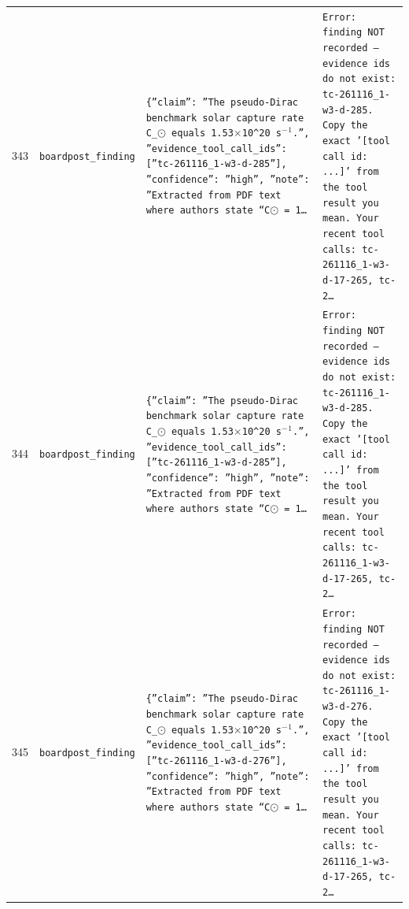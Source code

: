 \documentclass[11pt,a4paper]{article}
\begin{document}
\begin{longtable}{@{}p{}p{}p{}p{}@{}}
343 & \texttt{board}\newline\texttt{post\_\allowbreak{}finding} & \texttt{\{''claim'':\allowbreak{} ''The pseudo-Dirac benchmark solar capture rate C\_\allowbreak{}$\odot$ equals 1.53$\times$10\textasciicircum{}\allowbreak{}20~s$^-$$^1$.'',\allowbreak{} ''evidence\_\allowbreak{}tool\_\allowbreak{}call\_\allowbreak{}ids'':\allowbreak{} [''tc-261116\_\allowbreak{}1-w3-d-285'']\allowbreak{},\allowbreak{} ''confidence'':\allowbreak{} ''high'',\allowbreak{} ''note'':\allowbreak{} ''Extracted from PDF text where authors state ``C$\odot$ =\allowbreak{} 1\ldots{}\allowbreak{}} & \texttt{Error:\allowbreak{} finding NOT recorded --- evidence ids do not exist:\allowbreak{} tc-261116\_\allowbreak{}1-w3-d-285. Copy the exact '[tool call id:\allowbreak{} ...]\allowbreak{}' from the tool result you mean. Your recent tool calls:\allowbreak{} tc-261116\_\allowbreak{}1-w3-d-17-265,\allowbreak{} tc-2\ldots{}\allowbreak{}} \\
344 & \texttt{board}\newline\texttt{post\_\allowbreak{}finding} & \texttt{\{''claim'':\allowbreak{} ''The pseudo-Dirac benchmark solar capture rate C\_\allowbreak{}$\odot$ equals 1.53$\times$10\textasciicircum{}\allowbreak{}20~s$^-$$^1$.'',\allowbreak{} ''evidence\_\allowbreak{}tool\_\allowbreak{}call\_\allowbreak{}ids'':\allowbreak{} [''tc-261116\_\allowbreak{}1-w3-d-285'']\allowbreak{},\allowbreak{} ''confidence'':\allowbreak{} ''high'',\allowbreak{} ''note'':\allowbreak{} ''Extracted from PDF text where authors state ``C$\odot$ =\allowbreak{} 1\ldots{}\allowbreak{}} & \texttt{Error:\allowbreak{} finding NOT recorded --- evidence ids do not exist:\allowbreak{} tc-261116\_\allowbreak{}1-w3-d-285. Copy the exact '[tool call id:\allowbreak{} ...]\allowbreak{}' from the tool result you mean. Your recent tool calls:\allowbreak{} tc-261116\_\allowbreak{}1-w3-d-17-265,\allowbreak{} tc-2\ldots{}\allowbreak{}} \\
345 & \texttt{board}\newline\texttt{post\_\allowbreak{}finding} & \texttt{\{''claim'':\allowbreak{} ''The pseudo-Dirac benchmark solar capture rate C\_\allowbreak{}$\odot$ equals 1.53$\times$10\textasciicircum{}\allowbreak{}20~s$^-$$^1$.'',\allowbreak{} ''evidence\_\allowbreak{}tool\_\allowbreak{}call\_\allowbreak{}ids'':\allowbreak{} [''tc-261116\_\allowbreak{}1-w3-d-276'']\allowbreak{},\allowbreak{} ''confidence'':\allowbreak{} ''high'',\allowbreak{} ''note'':\allowbreak{} ''Extracted from PDF text where authors state ``C$\odot$ =\allowbreak{} 1\ldots{}\allowbreak{}} & \texttt{Error:\allowbreak{} finding NOT recorded --- evidence ids do not exist:\allowbreak{} tc-261116\_\allowbreak{}1-w3-d-276. Copy the exact '[tool call id:\allowbreak{} ...]\allowbreak{}' from the tool result you mean. Your recent tool calls:\allowbreak{} tc-261116\_\allowbreak{}1-w3-d-17-265,\allowbreak{} tc-2\ldots{}\allowbreak{}} \\
\bottomrule\end{longtable}
\end{document}
